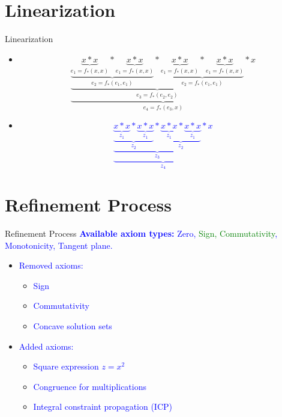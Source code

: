 \documentclass[]{beamer}
\begin{document}
\section{Linearization}
\begin{frame}{Linearization}
    \begin{itemize}
        \item {$$\underbrace{ \underbrace{ \underbrace{ \underbrace{ x \ast x }\limits_{e_1 = f_{*}(x, x)} \ast \underbrace{ x \ast x }\limits_{e_1 = f_{*}(x, x)}}\limits_{e_{2} = f_{*}(e_{1}, e_{1})} \ast \underbrace{ \underbrace{ x \ast x }\limits_{e_1 = f_{*}(x, x)} \ast \underbrace{ x \ast x }\limits_{e_1 = f_{*}(x, x)}}\limits_{e_{2} = f_{*}(e_{1}, e_{1})}}\limits_{e_{3} = f_{*}(e_{2}, e_{2})} \ast x}\limits_{e_{4} = f_{*}(e_{3}, x)}$$}
        \item \textcolor{blue}{$$\underbrace{ \underbrace{ \underbrace{ \underbrace{ x \ast x }\limits_{z_{1}} \ast \underbrace{ x \ast x }\limits_{z_{1}}}\limits_{z_{2}} \ast \underbrace{ \underbrace{ x \ast x }\limits_{z_{1}} \ast \underbrace{ x \ast x }\limits_{z_{1}}}\limits_{z_{2}}}\limits_{z_{3}} \ast x}\limits_{z_{4}}$$}
    \end{itemize}
\end{frame}

\section{Refinement Process}
\begin{frame}{Refinement Process}
    \textcolor<1>{blue}{\textbf{Available axiom types: }Zero, \textcolor<3>{green}{Sign, Commutativity}, Monotonicity, Tangent plane.}
    \bigskip
    \bigskip
    \begin{itemize}
        \item \textcolor<2-4>{blue}{Removed axioms:}
            \begin{itemize}
                \item \textcolor<3>{blue}{Sign}
                \item \textcolor<3>{blue}{Commutativity}
                \item \textcolor<4>{blue}{Concave solution sets}
            \end{itemize}
        \bigskip
        \bigskip
        \item \textcolor<5>{blue}{Added axioms:}
            \begin{itemize}
                \item \textcolor<5>{blue}{Square expression $z = x^2$}
                \item \textcolor<5>{blue}{Congruence for multiplications}
                \item \textcolor<5>{blue}{Integral constraint propagation (ICP)}
            \end{itemize}
    \end{itemize}
\end{frame}
\end{document}
